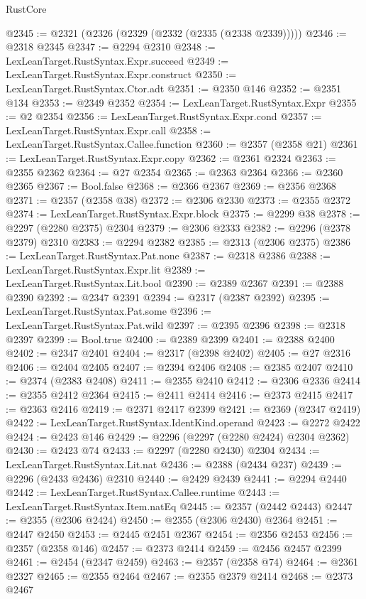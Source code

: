 \begin{lexlean}{RustCore}
\begin{coremodule}
@2345 := @2321 (@2326 (@2329 (@2332 (@2335 (@2338 @2339)))))
@2346 := @2318 @2345
@2347 := @2294 @2310
@2348 := LexLeanTarget.RustSyntax.Expr.succeed
@2349 := LexLeanTarget.RustSyntax.Expr.construct
@2350 := LexLeanTarget.RustSyntax.Ctor.adt
@2351 := @2350 @146
@2352 := @2351 @134
@2353 := @2349 @2352
@2354 := LexLeanTarget.RustSyntax.Expr
@2355 := @2 @2354
@2356 := LexLeanTarget.RustSyntax.Expr.cond
@2357 := LexLeanTarget.RustSyntax.Expr.call
@2358 := LexLeanTarget.RustSyntax.Callee.function
@2360 := @2357 (@2358 @21)
@2361 := LexLeanTarget.RustSyntax.Expr.copy
@2362 := @2361 @2324
@2363 := @2355 @2362
@2364 := @27 @2354
@2365 := @2363 @2364
@2366 := @2360 @2365
@2367 := Bool.false
@2368 := @2366 @2367
@2369 := @2356 @2368
@2371 := @2357 (@2358 @38)
@2372 := @2306 @2330
@2373 := @2355 @2372
@2374 := LexLeanTarget.RustSyntax.Expr.block
@2375 := @2299 @38
@2378 := @2297 (@2280 @2375) @2304
@2379 := @2306 @2333
@2382 := @2296 (@2378 @2379) @2310
@2383 := @2294 @2382
@2385 := @2313 (@2306 @2375)
@2386 := LexLeanTarget.RustSyntax.Pat.none
@2387 := @2318 @2386
@2388 := LexLeanTarget.RustSyntax.Expr.lit
@2389 := LexLeanTarget.RustSyntax.Lit.bool
@2390 := @2389 @2367
@2391 := @2388 @2390
@2392 := @2347 @2391
@2394 := @2317 (@2387 @2392)
@2395 := LexLeanTarget.RustSyntax.Pat.some
@2396 := LexLeanTarget.RustSyntax.Pat.wild
@2397 := @2395 @2396
@2398 := @2318 @2397
@2399 := Bool.true
@2400 := @2389 @2399
@2401 := @2388 @2400
@2402 := @2347 @2401
@2404 := @2317 (@2398 @2402)
@2405 := @27 @2316
@2406 := @2404 @2405
@2407 := @2394 @2406
@2408 := @2385 @2407
@2410 := @2374 (@2383 @2408)
@2411 := @2355 @2410
@2412 := @2306 @2336
@2414 := @2355 @2412 @2364
@2415 := @2411 @2414
@2416 := @2373 @2415
@2417 := @2363 @2416
@2419 := @2371 @2417 @2399
@2421 := @2369 (@2347 @2419)
@2422 := LexLeanTarget.RustSyntax.IdentKind.operand
@2423 := @2272 @2422
@2424 := @2423 @146
@2429 := @2296 (@2297 (@2280 @2424) @2304 @2362)
@2430 := @2423 @74
@2433 := @2297 (@2280 @2430) @2304
@2434 := LexLeanTarget.RustSyntax.Lit.nat
@2436 := @2388 (@2434 @237)
@2439 := @2296 (@2433 @2436) @2310
@2440 := @2429 @2439
@2441 := @2294 @2440
@2442 := LexLeanTarget.RustSyntax.Callee.runtime
@2443 := LexLeanTarget.RustSyntax.Item.natEq
@2445 := @2357 (@2442 @2443)
@2447 := @2355 (@2306 @2424)
@2450 := @2355 (@2306 @2430) @2364
@2451 := @2447 @2450
@2453 := @2445 @2451 @2367
@2454 := @2356 @2453
@2456 := @2357 (@2358 @146)
@2457 := @2373 @2414
@2459 := @2456 @2457 @2399
@2461 := @2454 (@2347 @2459)
@2463 := @2357 (@2358 @74)
@2464 := @2361 @2327
@2465 := @2355 @2464
@2467 := @2355 @2379 @2414
@2468 := @2373 @2467

\end{coremodule}
\end{lexlean}
